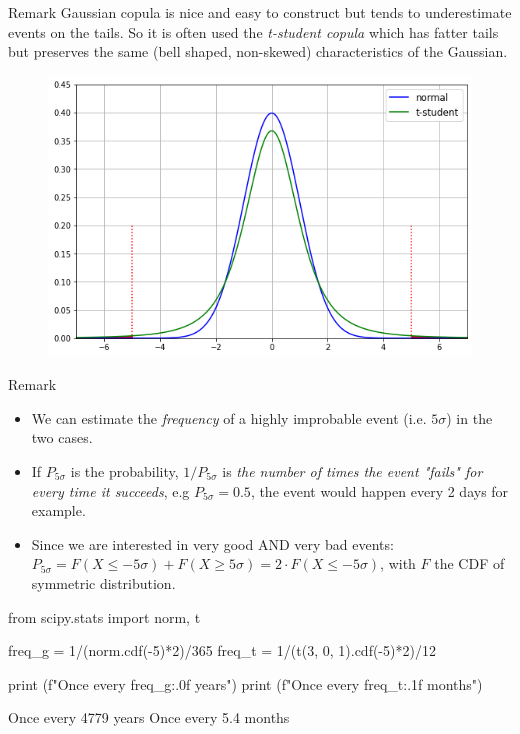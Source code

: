 \documentclass{beamer}
\begin{document}
\begin{frame}{Remark}
Gaussian copula is nice and easy to construct but tends to underestimate events on the tails. So it is often used the \emph{t-student copula} which has fatter tails but preserves the same (bell shaped, non-skewed) characteristics of the Gaussian.

\begin{figure}[h]
  \begin{center}
    \includegraphics[width=0.5\linewidth]{gauss_vs_t}
  \end{center}
\end{figure}
\end{frame}

\begin{frame}[fragile]{Remark}
\begin{itemize}
	\item We can estimate the \emph{frequency} of a highly improbable event (i.e. $5\sigma$) in the two cases.
	\item If $P_{5\sigma}$ is the probability, $1/P_{5\sigma}$ is \emph{the number of times the event "fails" for every time it succeeds}, e.g $P_{5\sigma}=0.5$, the event would happen every 2 days for example.
	\item Since we are interested in very good AND very bad events:
	$P_{5\sigma} = F(X\leq-5\sigma) + F(X\geq5\sigma) = 2\cdot F(X\leq-5\sigma)$, with $F$ the CDF of symmetric distribution. 
\end{itemize}
 \begin{ipython}
from scipy.stats import norm, t
			
freq_g = 1/(norm.cdf(-5)*2)/365
freq_t = 1/(t(3, 0, 1).cdf(-5)*2)/12
			
print (f"Once every {freq_g:.0f} years")
print (f"Once every {freq_t:.1f} months")
\end{ipython}
\begin{ioutput}
Once every 4779 years
Once every 5.4 months
\end{ioutput}
\end{frame}
\end{document}
